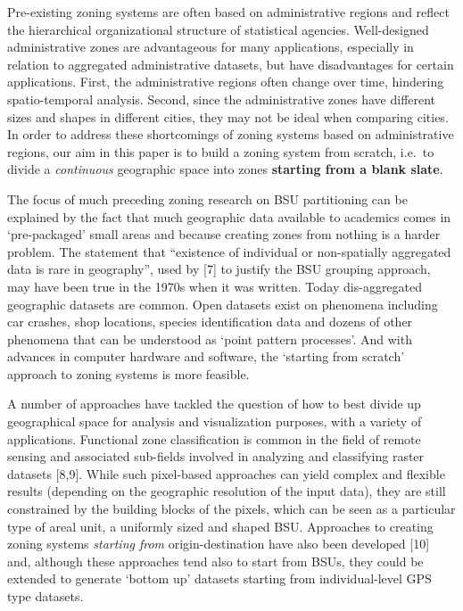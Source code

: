 \documentclass{josis}
\begin{document}
Pre-existing zoning systems are often based on administrative regions and reflect the hierarchical organizational structure of statistical agencies.
Well-designed administrative zones are advantageous for many applications, especially in relation to aggregated administrative datasets, but have disadvantages for certain applications.
First, the administrative regions often change over time, hindering spatio-temporal analysis.
Second, since the administrative zones have different sizes and shapes in different cities, they may not be ideal when comparing cities.
In order to address these shortcomings of zoning systems based on administrative regions, our aim in this paper is to build a zoning system from scratch, i.e.~to divide a \emph{continuous} geographic space into zones \textbf{starting from a blank slate}.

The focus of much preceding zoning research on BSU partitioning can be explained by the fact that much geographic data available to academics comes in `pre-packaged' small areas and because creating zones from nothing is a harder problem.
The statement that ``existence of individual or non-spatially aggregated data is rare in geography'', used by {[}7{]} to justify the BSU grouping approach, may have been true in the 1970s when it was written.
Today dis-aggregated geographic datasets are common.
Open datasets exist on phenomena including car crashes, shop locations, species identification data and dozens of other phenomena that can be understood as `point pattern processes'.
And with advances in computer hardware and software, the `starting from scratch' approach to zoning systems is more feasible.

A number of approaches have tackled the question of how to best divide up geographical space for analysis and visualization purposes, with a variety of applications.
Functional zone classification is common in the field of remote sensing and associated sub-fields involved in analyzing and classifying raster datasets {[}8,9{]}.
While such pixel-based approaches can yield complex and flexible results (depending on the geographic resolution of the input data), they are still constrained by the building blocks of the pixels, which can be seen as a particular type of areal unit, a uniformly sized and shaped BSU.
Approaches to creating zoning systems \emph{starting from} origin-destination have also been developed {[}10{]} and, although these approaches tend also to start from BSUs, they could be extended to generate `bottom up' datasets starting from individual-level GPS type datasets.
\end{document}
